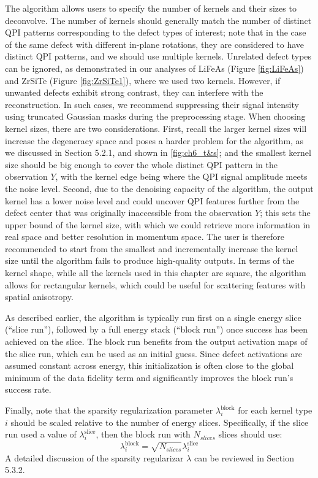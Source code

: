The algorithm allows users to specify the number of kernels and their sizes to deconvolve. The number of kernels should generally match the number of distinct QPI patterns corresponding to the defect types of interest; note that in the case of the same defect with different in-plane rotations, they are considered to have distinct QPI patterns, and we should use multiple kernels. Unrelated defect types can be ignored, as demonstrated in our analyses of LiFeAs (Figure \ref{fig:LiFeAs}) and ZrSiTe (Figure \ref{fig:ZrSiTe1}), where we used two kernels. However, if unwanted defects exhibit strong contrast, they can interfere with the reconstruction. In such cases, we recommend suppressing their signal intensity using truncated Gaussian masks during the preprocessing stage. When choosing kernel sizes, there are two considerations. First, recall the larger kernel sizes will increase the degeneracy space and poses a harder problem for the algorithm, as we discussed in Section 5.2.1, and shown in \ref{fig:ch6_t&s}; and the smallest kernel size should be big enough to cover the whole distinct QPI pattern in the observation $Y$, with the kernel edge being where the QPI signal amplitude meets the noise level. Second, due to the denoising capacity of the algorithm, the output kernel has a lower noise level and could uncover QPI features further from the defect center that was originally inaccessible from the observation $Y$; this sets the upper bound of the kernel size, with which we could retrieve more information in real space and better resolution in momentum space. The user is therefore recommended to start from the smallest and incrementally increase the kernel size until the algorithm fails to produce high-quality outputs. In terms of the kernel shape, while all the kernels used in this chapter are square, the algorithm allows for rectangular kernels, which could be useful for scattering features with spatial anisotropy.

As described earlier, the algorithm is typically run first on a single energy slice (“slice run”), followed by a full energy stack (“block run”) once success has been achieved on the slice. The block run benefits from the output activation maps of the slice run, which can be used as an initial guess. Since defect activations are assumed constant across energy, this initialization is often close to the global minimum of the data fidelity term and significantly improves the block run’s success rate.

Finally, note that the sparsity regularization parameter $\lambda_i^{\text{block}}$ for each kernel type $i$ should be scaled relative to the number of energy slices. Specifically, if the slice run used a value of $\lambda_i^{\text{slice}}$, then the block run with $N_{slices}$ slices should use:
\begin{equation}
	\lambda_i^{\text{block}} = \sqrt{N_{slices}}\lambda_i^{\text{slice}}
\end{equation}
A detailed discussion of the sparsity regularizar $\lambda$ can be reviewed in Section 5.3.2. 

